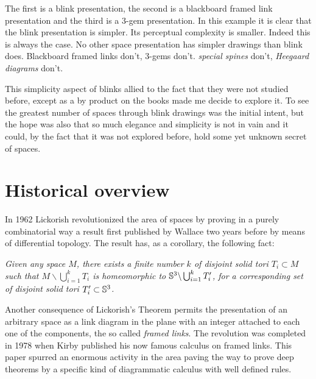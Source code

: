 The first is a blink presentation, the second is a blackboard
framed link presentation and the third is a 3-gem presentation.
In this example it is clear that the blink presentation is
simpler. Its perceptual complexity is smaller. Indeed this is
always the case. No other space presentation has simpler drawings
than blink does. Blackboard framed links don't, 3-gems don't.
{\it special spines} don't, {\it Heegaard diagrams} don't.

This simplicity aspect of blinks allied to the fact that they were
not studied before, except as a by product on the books
\cite{KauffmanAndLins1994, Lins1995} made me decide to explore it.
To see the greatest number of spaces through blink
drawings was the initial intent, but the hope was also that
so much elegance and simplicity is not in vain and it could,
by the fact that it was not explored before, hold
some yet unknown secret of spaces.

\section{Historical overview}
\label{sec:historicalOverview}

In 1962 Lickorish \cite{Lickorish1962} revolutionized the area of
spaces by proving in a purely combinatorial way a result first
published by Wallace \cite{Wallace1960} two years before by means of
differential topology. The result has, as a corollary, the following
fact:

{\em Given any space $M$, there exists a finite number $k$ of
disjoint solid tori $T_i\subset M$ such that $M \backslash
\bigcup_{i=1}^k T_i$ is homeomorphic to
$\mathbb{S}^3\backslash\bigcup_{i=1}^k T'_i$, for a corresponding set of
disjoint solid tori $T'_i \subset \mathbb{S}^3$.}

Another consequence of Lickorish's Theorem permits the
presentation of an arbitrary space as a link diagram in the plane
with an integer attached to each one of the components, the so
called {\em framed links}. The revolution was completed in 1978 when
Kirby \cite{Kirby1978} published his now famous calculus on framed links.
This paper spurred an enormous activity in the
area paving the way to prove deep theorems by a specific kind of
diagrammatic calculus with well defined rules.

